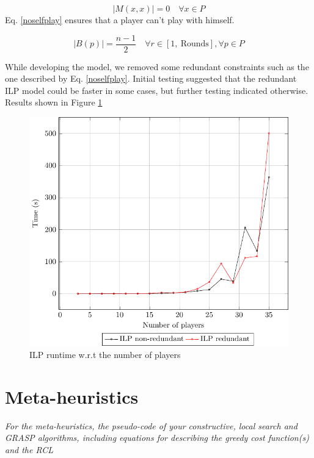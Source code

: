 \documentclass[a4paper, 10pt]{article}
\begin{document}
\begin{minipage}{0.45\linewidth}
\begin{equation}
    \label{noselfplay}
    |M(x,x)| = 0 \quad \forall x \in P 
\end{equation}
Eq. \ref{noselfplay} ensures that a player can't play with himself. 

\begin{equation}
    \label{blackfairness}
    |B(p)| = \frac{n-1}{2} \quad \forall r \in [1, \ \text{Rounds}], \forall p \in P
\end{equation}

    While developing the model, we removed some redundant constraints such as the one described by Eq. \ref{noselfplay}. Initial testing suggested that the redundant ILP model could be faster in some cases, but further testing indicated otherwise. Results shown in Figure \ref{figilp}
\end{minipage}
\begin{minipage}{0.49\linewidth}
\begin{figure}[H]
    \includegraphics[width=\linewidth]{plots/time_per_instance.pdf}
    \caption{ILP runtime w.r.t the number of players}
    \label{figilp}
\end{figure}
\end{minipage}


\clearpage

\section{Meta-heuristics}
\textit{For the meta-heuristics, the pseudo-code of your constructive, local search and GRASP algorithms, including equations for describing the greedy cost function(s) and the RCL}
\end{document}
